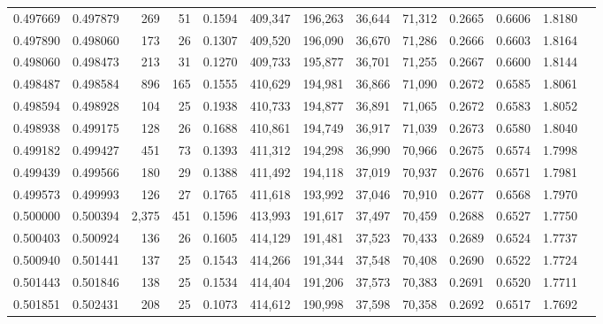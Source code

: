 \begin{tabular}{rrrrrrrrrrrrr}
0.497669 & 0.497879 &   269 &  51 &                                     0.1594 & 409,347 & 196,263 &  36,644 &  71,312 & 0.2665 & 0.6606 & 1.8180 \\
0.497890 & 0.498060 &   173 &  26 &                                     0.1307 & 409,520 & 196,090 &  36,670 &  71,286 & 0.2666 & 0.6603 & 1.8164 \\
0.498060 & 0.498473 &   213 &  31 &                                     0.1270 & 409,733 & 195,877 &  36,701 &  71,255 & 0.2667 & 0.6600 & 1.8144 \\
0.498487 & 0.498584 &   896 & 165 &                                     0.1555 & 410,629 & 194,981 &  36,866 &  71,090 & 0.2672 & 0.6585 & 1.8061 \\
0.498594 & 0.498928 &   104 &  25 &                                     0.1938 & 410,733 & 194,877 &  36,891 &  71,065 & 0.2672 & 0.6583 & 1.8052 \\
0.498938 & 0.499175 &   128 &  26 &                                     0.1688 & 410,861 & 194,749 &  36,917 &  71,039 & 0.2673 & 0.6580 & 1.8040 \\
0.499182 & 0.499427 &   451 &  73 &                                     0.1393 & 411,312 & 194,298 &  36,990 &  70,966 & 0.2675 & 0.6574 & 1.7998 \\
0.499439 & 0.499566 &   180 &  29 &                                     0.1388 & 411,492 & 194,118 &  37,019 &  70,937 & 0.2676 & 0.6571 & 1.7981 \\
0.499573 & 0.499993 &   126 &  27 &                                     0.1765 & 411,618 & 193,992 &  37,046 &  70,910 & 0.2677 & 0.6568 & 1.7970 \\
0.500000 & 0.500394 & 2,375 & 451 &                                     0.1596 & 413,993 & 191,617 &  37,497 &  70,459 & 0.2688 & 0.6527 & 1.7750 \\
0.500403 & 0.500924 &   136 &  26 &                                     0.1605 & 414,129 & 191,481 &  37,523 &  70,433 & 0.2689 & 0.6524 & 1.7737 \\
0.500940 & 0.501441 &   137 &  25 &                                     0.1543 & 414,266 & 191,344 &  37,548 &  70,408 & 0.2690 & 0.6522 & 1.7724 \\
0.501443 & 0.501846 &   138 &  25 &                                     0.1534 & 414,404 & 191,206 &  37,573 &  70,383 & 0.2691 & 0.6520 & 1.7711 \\
0.501851 & 0.502431 &   208 &  25 &                                     0.1073 & 414,612 & 190,998 &  37,598 &  70,358 & 0.2692 & 0.6517 & 1.7692 \\

\end{tabular}
